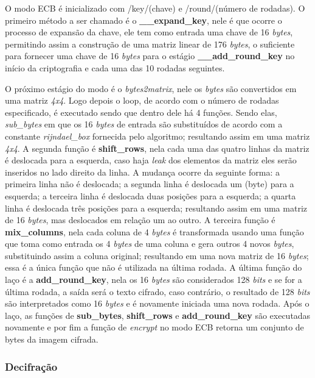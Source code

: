 \documentclass[11pt]{article}
\begin{document}
O modo ECB é inicializado com /key/(chave) e /round/(número de rodadas).
O primeiro método a ser chamado é o \textbf{\_\_expand\_key}, nele é que ocorre o processo
de expansão da chave, ele tem como entrada uma chave de 16 \emph{bytes}, permitindo
assim a construção de uma matriz linear de 176 \emph{bytes}, o suficiente para
fornecer uma chave de 16 \emph{bytes} para o estágio \textbf{\_\_add\_round\_key} no início da
criptografia e cada uma das 10 rodadas seguintes.

O próximo estágio do modo é o \emph{bytes2matrix}, nele os \emph{bytes} são convertidos em
uma matriz \emph{4x4}. Logo depois o loop, de acordo com o número de rodadas
especificado, é executado sendo que dentro dele há 4 funções. Sendo elas,
\emph{sub\_bytes} em que os 16 \emph{bytes} de entrada são substituídos de acordo com a
constante \emph{rijndael\_box} fornecida pelo algoritmo; resultando assim em uma
matriz \emph{4x4}. A segunda função é \textbf{shift\_rows}, nela cada uma das quatro linhas
da matriz é deslocada para a esquerda, caso haja \emph{leak} dos elementos da matriz
eles serão inseridos no lado direito da linha. A mudança ocorre da seguinte
forma: a primeira linha não é deslocada; a segunda linha é deslocada um (byte)
para a esquerda; a terceira linha é deslocada duas posições para a esquerda; a
quarta linha é deslocada três posições para a esquerda; resultando assim em uma
matriz de 16 \emph{bytes}, mas deslocados em relação um ao outro. A terceira função é
\textbf{mix\_columns}, nela cada coluna de 4 \emph{bytes} é transformada usando uma função
que toma como entrada os 4 \emph{bytes} de uma coluna e gera outros 4 novos \emph{bytes},
substituindo assim a coluna original; resultando em uma nova matriz de 16
\emph{bytes}; essa é a única função que não é utilizada na última rodada. A última
função do laço é a \textbf{add\_round\_key}, nela os 16 \emph{bytes} são considerados 128
\emph{bits} e se for a última rodada, a saída será o texto cifrado, caso contrário,
o resultado de 128 \emph{bits} são interpretados como 16 \emph{bytes} e é novamente
iniciada uma nova rodada. Após o laço, as funções de \textbf{sub\_bytes}, \textbf{shift\_rows} e
\textbf{add\_round\_key} são executadas novamente e por fim a função de \emph{encrypt} no
modo ECB retorna um conjunto de bytes da imagem cifrada.

\subsubsection{Decifração}
\label{sec:orgce52941}
\end{document}

